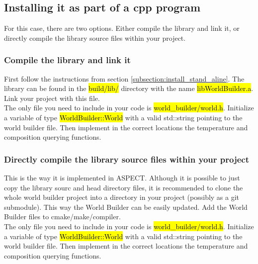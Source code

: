 \documentclass{book}
\newcommand{\WB}{{World Builder}}
\newcommand{\aspect}{{ASPECT}}
\begin{document}
\subsection{Installing it as part of a cpp program}
For this case, there are two options. Either compile the library and link it, or directly compile the library source files within your project.

\subsubsection{Compile the library and link it}
First follow the instructions from section \ref{subsection:install_stand_aline}. The library can be found in the \hl{build/lib/} directory with the name \hl{libWorldBuilder.a}. Link your project with this file. 
\\
The only file you need to include in your code is \hl{world\_builder/world.h}. Initialize a variable of type \hl{WorldBuilder::World} with a valid std::string pointing to the world builder file. Then implement in the correct locations the temperature and composition querying functions.

\subsubsection{Directly compile the library source files within your project}
\label{subsubsection:direct_compile_library_source}
This is the way it is implemented in \aspect{}. Although it is possible to just copy the library sourc and head directory files, it is recommended to clone the whole world builder project into a directory in your project (possibly as a git submodule). This way the \WB{} can be easily updated. Add the \WB{} files to cmake/make/compiler. 
\\
The only file you need to include in your code is \hl{world\_builder/world.h}. Initialize a variable of type \hl{WorldBuilder::World} with a valid std::string pointing to the world builder file. Then implement in the correct locations the temperature and composition querying functions.
\end{document}
